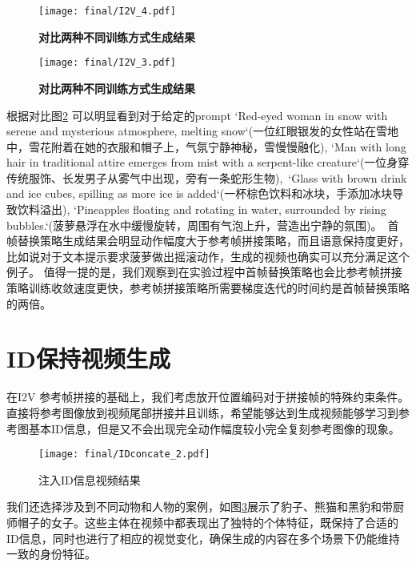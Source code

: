 \begin{figure}[htbp]
    \centering
    \texttt{[image: final/I2V\_4.pdf]}
    \caption{\textbf{对比两种不同训练方式生成结果}
    }
    \label{I2V_4}
\end{figure}

\begin{figure}[htbp]
    \centering
    \texttt{[image: final/I2V\_3.pdf]}
    \caption{\textbf{对比两种不同训练方式生成结果}
    }
    \label{I2V_3}
\end{figure}

根据对比图\ref{I2V_3} 可以明显看到对于给定的prompt `Red-eyed woman in snow with serene and mysterious atmosphere, melting snow`(一位红眼银发的女性站在雪地中，雪花附着在她的衣服和帽子上，气氛宁静神秘，雪慢慢融化), `Man with long hair in traditional attire emerges from mist with a serpent-like creature`(一位身穿传统服饰、长发男子从雾气中出现，旁有一条蛇形生物),\
`Glass with brown drink and ice cubes, spilling as more ice is added`(一杯棕色饮料和冰块，手添加冰块导致饮料溢出), `Pineapples floating and rotating in water, surrounded by rising bubbles.`(菠萝悬浮在水中缓慢旋转，周围有气泡上升，营造出宁静的氛围)。\
首帧替换策略生成结果会明显动作幅度大于参考帧拼接策略，而且语意保持度更好，比如说对于文本提示要求菠萝做出摇滚动作，生成的视频也确实可以充分满足这个例子。
值得一提的是，我们观察到在实验过程中首帧替换策略也会比参考帧拼接策略训练收敛速度更快，参考帧拼接策略所需要梯度迭代的时间约是首帧替换策略的两倍。

\section{ID保持视频生成}
在I2V 参考帧拼接的基础上，我们考虑放开位置编码对于拼接帧的特殊约束条件。直接将参考图像放到视频尾部拼接并且训练，希望能够达到生成视频能够学习到参考图基本ID信息，但是又不会出现完全动作幅度较小完全复刻参考图像的现象。

\begin{figure}[htbp]
    \centering
    \texttt{[image: final/IDconcate\_2.pdf]}
    \caption{\textbf{}
        注入ID信息视频结果
    }
    \label{IDconcate_2}
\end{figure}
我们还选择涉及到不同动物和人物的案例，如图\ref{IDconcate_2}展示了豹子、熊猫和黑豹和带厨师帽子的女子。这些主体在视频中都表现出了独特的个体特征，既保持了合适的ID信息，同时也进行了相应的视觉变化，确保生成的内容在多个场景下仍能维持一致的身份特征。


